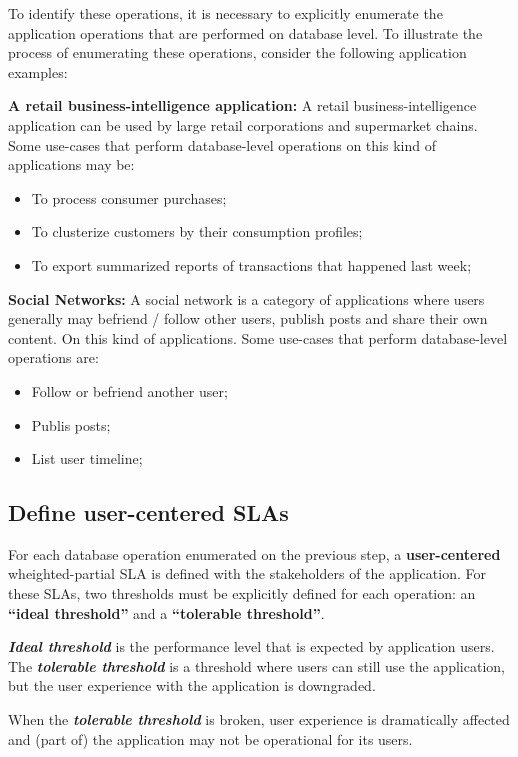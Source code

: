 To identify these operations, it is necessary to explicitly enumerate the application operations that are performed on database level. To illustrate the process of enumerating these operations, consider the following application examples: 

\textbf{A retail business-intelligence application: } A retail business-intelligence application can be used by large retail corporations and supermarket chains. Some use-cases that perform database-level operations on this kind of applications may be:

\begin{itemize}
\item{To process consumer purchases;}
\item{To clusterize customers by their consumption profiles;}
\item{To export summarized reports of transactions that happened last week;}
\end{itemize}

\textbf{Social Networks:} A social network is a category of applications where users generally may befriend / follow other users, publish posts and share their own content. On this kind of applications. Some use-cases that perform database-level operations are: 

\begin{itemize}
\item{Follow or befriend another user;}
\item{Publis posts;}
\item{List user timeline;}
\end{itemize}


\subsection{Define user-centered SLAs}
\label{defineusercenteredslas}
For each database operation enumerated on the previous step, a \textbf{user-centered} wheighted-partial SLA is defined with the stakeholders of the application. For these SLAs, two thresholds must be explicitly defined for each operation: an \textbf{``ideal threshold''} and a \textbf{``tolerable threshold''}.

\textbf{\textit{Ideal threshold}} is the performance level that is expected by application users. The \textbf{\textit{tolerable threshold}} is a threshold where users can still use the application, but the user experience with the application is downgraded.

When the \textbf{\textit{tolerable threshold}} is broken, user experience is dramatically affected and (part of) the application may not be operational for its users.

